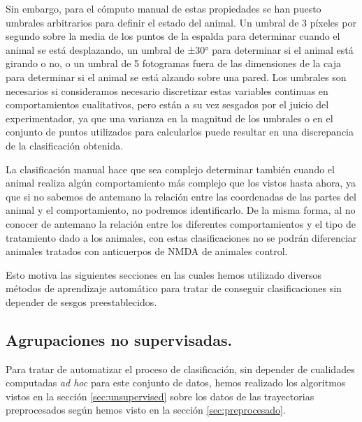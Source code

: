 Sin embargo, para el cómputo manual de estas propiedades se han puesto umbrales arbitrarios para definir el estado del animal. Un umbral de 3 píxeles por segundo sobre la media de los puntos de la espalda para determinar cuando el animal se está desplazando, un umbral de ±30° para determinar si el animal está girando o no, o un umbral de 5 fotogramas fuera de las dimensiones de la caja para determinar si el animal se está alzando sobre una pared. Los umbrales son necesarios si consideramos necesario discretizar estas variables continuas en comportamientos cualitativos, pero están a su vez sesgados por el juicio del experimentador, ya que una varianza en la magnitud de los umbrales o en el conjunto de puntos utilizados para calcularlos puede resultar en una discrepancia de la clasificación obtenida.

La clasificación manual hace que sea complejo determinar también cuando el animal realiza algún comportamiento más complejo que los vistos hasta ahora, ya que si no sabemos de antemano la relación entre las coordenadas de las partes del animal y el comportamiento, no podremos identificarlo. De la misma forma, al no conocer de antemano la relación entre los diferentes comportamientos y el tipo de tratamiento dado a los animales, con estas clasificaciones no se podrán diferenciar animales tratados con anticuerpos de NMDA de animales control.

Esto motiva las siguientes secciones en las cuales hemos utilizado diversos métodos de aprendizaje automático para tratar de conseguir clasificaciones sin depender de sesgos preestablecidos.

\subsection{Agrupaciones no supervisadas.}
Para tratar de automatizar el proceso de clasificación, sin depender de cualidades computadas \textit{ad hoc} para este conjunto de datos, hemos realizado los algoritmos vistos en la sección \ref{sec:unsupervised} sobre los datos de las trayectorias preprocesados según hemos visto en la sección \ref{sec:preprocesado}.

